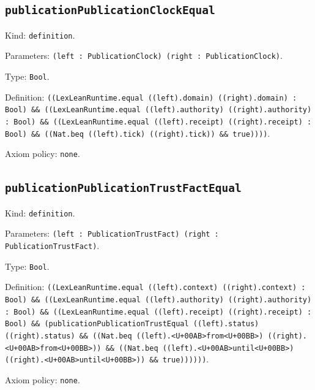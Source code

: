 \documentclass[11pt]{article}
\begin{document}
\subsection*{\texttt{publicationPublicationClockEqual}}
\noindent Kind: \texttt{definition}.\par
\noindent Parameters: \texttt{(left : PublicationClock) (right : PublicationClock)}.\par
\noindent Type: \texttt{Bool}.\par
\noindent Definition: \texttt{((LexLeanRuntime.equal ((left).domain) ((right).domain) : Bool) \&\& ((LexLeanRuntime.equal ((left).authority) ((right).authority) : Bool) \&\& ((LexLeanRuntime.equal ((left).receipt) ((right).receipt) : Bool) \&\& ((Nat.beq ((left).tick) ((right).tick)) \&\& true))))}.\par
\noindent Axiom policy: \texttt{none}.\par
\subsection*{\texttt{publicationPublicationTrustFactEqual}}
\noindent Kind: \texttt{definition}.\par
\noindent Parameters: \texttt{(left : PublicationTrustFact) (right : PublicationTrustFact)}.\par
\noindent Type: \texttt{Bool}.\par
\noindent Definition: \texttt{((LexLeanRuntime.equal ((left).context) ((right).context) : Bool) \&\& ((LexLeanRuntime.equal ((left).authority) ((right).authority) : Bool) \&\& ((LexLeanRuntime.equal ((left).receipt) ((right).receipt) : Bool) \&\& (publicationPublicationTrustEqual ((left).status) ((right).status) \&\& ((Nat.beq ((left).<U+00AB>from<U+00BB>) ((right).<U+00AB>from<U+00BB>)) \&\& ((Nat.beq ((left).<U+00AB>until<U+00BB>) ((right).<U+00AB>until<U+00BB>)) \&\& true))))))}.\par
\noindent Axiom policy: \texttt{none}.\par
\end{document}
